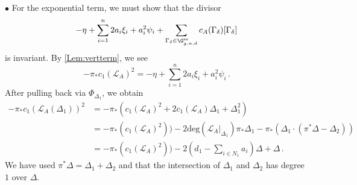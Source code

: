  $\bullet$ For the exponential term, we must show that the divisor
\[-\eta + \sum_{i=1}^n 2 a_i \xi_i+ a_i^2 \psi_i  + \sum_{\Gamma_\delta \in \G_{g,n,d}^\textup{se}} c_A(\Gamma_\delta) [\Gamma_\delta]\]
is invariant. By \cref{Lem:vertterm}, we see
\[- \pi_* c_1(\mathcal{L}_A)^2 =
-\eta + \sum_{i=1}^n 2 a_i \xi_i+ a_i^2 \psi_i \, .\]
After pulling back via $\Phi_{\Delta_1}$, we obtain
\begin{align*}
- \pi_* c_1(\mathcal{L}_A(\Delta_1))^2 &= - \pi_* \left( c_1(\mathcal{L}_A)^2 + 2 c_1(\mathcal{L}_A) \Delta_1 + \Delta_1^2\right)\\
&= - \pi_* \left( c_1(\mathcal{L}_A)^2\right)) -2 \mathrm{deg}\left(\mathcal{L}_A|_{\Delta_1}\right) \pi_* \Delta_1 - \pi_* \left( \Delta_1 \cdot (\pi^* \Delta - \Delta_2)\right)\\
&= - \pi_* \left( c_1(\mathcal{L}_A)^2\right)) -2 \left(d_1 - \sum_{i \in N_1} a_i\right) \Delta + \Delta\, .
\end{align*}
We have used $\pi^* \Delta = \Delta_1 + \Delta_2$
and that the intersection of $\Delta_1$ and $\Delta_2$ has degree $1$ over $\Delta$.


